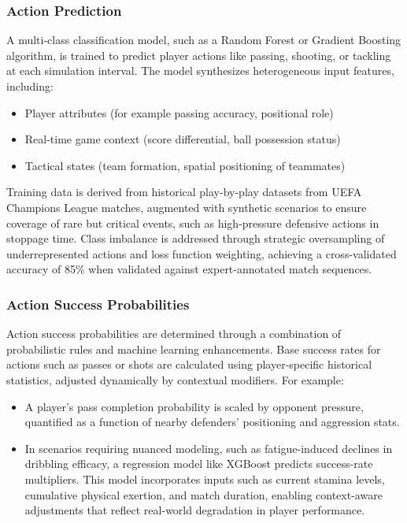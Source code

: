 \documentclass[12pt]{article}
\begin{document}
\subsubsection{Action Prediction}
A multi-class classification model, such as a Random Forest or Gradient Boosting algorithm, is trained to predict player actions like passing, shooting, or tackling at each simulation interval. The model synthesizes heterogeneous input features, including:

\begin{itemize}
    \item Player attributes (for example passing accuracy, positional role)
    \item Real-time game context (score differential, ball possession status)
    \item Tactical states (team formation, spatial positioning of teammates)
\end{itemize}

Training data is derived from historical play-by-play datasets from UEFA Champions League matches, augmented with synthetic scenarios to ensure coverage of rare but critical events, such as high-pressure defensive actions in stoppage time. Class imbalance is addressed through strategic oversampling of underrepresented actions and loss function weighting, achieving a cross-validated accuracy of 85\% when validated against expert-annotated match sequences.

\subsubsection{Action Success Probabilities}
Action success probabilities are determined through a combination of probabilistic rules and machine learning enhancements. Base success rates for actions such as passes or shots are calculated using player-specific historical statistics, adjusted dynamically by contextual modifiers. For example:
\begin{itemize}
    \item A player's pass completion probability is scaled by opponent pressure, quantified as a function of nearby defenders' positioning and aggression stats.
    \item In scenarios requiring nuanced modeling, such as fatigue-induced declines in dribbling efficacy, a regression model like XGBoost predicts success-rate multipliers. This model incorporates inputs such as current stamina levels, cumulative physical exertion, and match duration, enabling context-aware adjustments that reflect real-world degradation in player performance.
\end{itemize}
\end{document}
